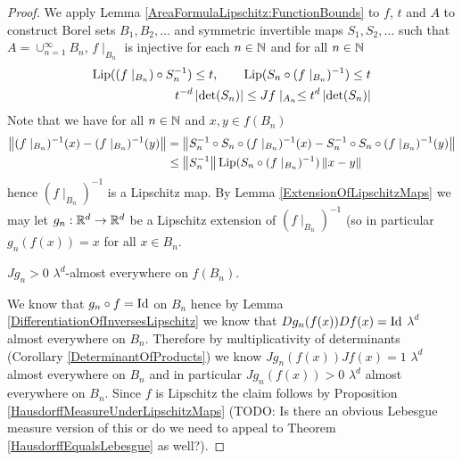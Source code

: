 \begin{proof}
We apply Lemma \ref{AreaFormulaLipschitz:FunctionBounds} to $f$, $t$ and $A$ to construct Borel sets $B_1, B_2, \dotsc$ and
symmetric invertible maps $S_1, S_2, \dotsc$ such that $A = \cup_{n=1}^\infty B_n$, $f \mid_{B_n}$ is injective for each $n \in \mathbb{N}$
and for all $n \in \mathbb{N}$
\begin{align*}
\operatorname*{Lip}((f \mid_{B_n}) \circ  S_n^{-1} ) \leq t, \qquad \operatorname*{Lip}(S_n \circ (f  \mid_{B_n})^{-1} ) \leq t \\
t^{-d} \left \vert \det(S_n) \right \vert \leq Jf\mid_{A_n} \leq t^{d} \left \vert \det(S_n) \right \vert
\end{align*}
Note that we have for all $n \in \mathbb{N}$ and $x,y \in f(B_n)$
\begin{align*}
\left \lVert  (f  \mid_{B_n})^{-1}(x) -  (f  \mid_{B_n})^{-1}(y) \right \rVert &= \left \lVert  S_n^{-1} \circ S_n \circ (f  \mid_{B_n})^{-1}(x) - S_n^{-1} \circ S_n \circ (f  \mid_{B_n})^{-1}(y) \right \rVert \\
&\leq \left \lVert S_n^{-1} \right \rVert \operatorname*{Lip}(S_n \circ (f  \mid_{B_n})^{-1} ) \left \lVert x-y \right \rVert
\end{align*}
hence $(f  \mid_{B_n})^{-1}$ is a Lipschitz map.  By Lemma \ref{ExtensionOfLipschitzMaps} we may let $g_n : \mathbb{R}^d \to \mathbb{R}^d$ be a Lipschitz extension of $(f  \mid_{B_n})^{-1}$ (so 
in particular $g_n (f(x)) = x$ for all $x \in B_n$.

\begin{clm}\label{clm:CoareaFormulaLipschitz:FunctionBounds:JacobianOfExtendedLocalInverse} $Jg_n > 0$ $\lambda^d$-almost everywhere on $f(B_n)$.
\end{clm}
We know that $g_n \circ f = \operatorname*{Id}$ on $B_n$ hence by Lemma \ref{DifferentiationOfInversesLipschitz} we know that $D g_n (f(x)) Df(x) = \operatorname*{Id}$ $\lambda^d$ almost
everywhere on $B_n$.  Therefore by multiplicativity of determinants (Corollary \ref{DeterminantOfProducts}) we know $J g_n (f(x)) Jf(x) = 1$ $\lambda^d$ almost
everywhere on $B_n$ and in particular $J g_n (f(x)) > 0$ $\lambda^d$ almost everywhere on $B_n$.  Since $f$ is Lipschitz the claim follows by Proposition \ref{HausdorffMeasureUnderLipschitzMaps} (TODO: Is there an obvious Lebesgue measure version of this or do we need to appeal to Theorem \ref{HausdorffEqualsLebesgue} as well?).


\end{proof}
